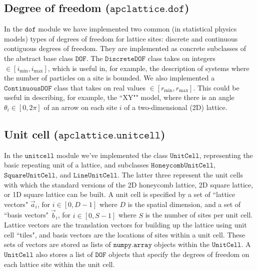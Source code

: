 \documentclass{article}
\begin{document}
\subsection{Degree of freedom ($\texttt{apclattice.dof}$)}
In the $\texttt{dof}$ module we have implemented two common (in statistical physics models) types of degrees of freedom for lattice sites: discrete and continuous contiguous degrees of freedom. They are implemented as concrete subclasses of the abstract base class $\texttt{DOF}$. The $\texttt{DiscreteDOF}$ class takes on integers $\in [i_\mathrm{min}, i_\mathrm{max}]$, which is useful in, for example, the description of systems where the number of particles on a site is bounded. We also implemented a $\texttt{ContinuousDOF}$ class that takes on real values $\in [r_\mathrm{min}, r_\mathrm{max}]$. This could be useful in describing, for example, the ``XY"" model, where there is an angle $\theta_i \in [0, 2 \pi]$ of an arrow on each site $i$ of a two-dimensional (2D) lattice.

\subsection{Unit cell ($\texttt{apclattice.unitcell}$)}
In the $\texttt{unitcell}$ module we've implemented the class $\texttt{UnitCell}$, representing the basic repeating unit of a lattice, and subclasses $\texttt{HoneycombUnitCell}$, $\texttt{SquareUnitCell}$, and $\texttt{LineUnitCell}$. The latter three represent the unit cells with which the standard versions of the 2D honeycomb lattice, 2D square lattice, or 1D square lattice can be built. A unit cell is specified by a set of ``lattice vectors" $\vec{a}_i$, for $i\in [0, D-1]$ where $D$ is the spatial dimension, and a set of ``basis vectors" $\vec{b}_i$, for $i \in [0, S-1]$ where $S$ is the number of sites per unit cell. Lattice vectors are the translation vectors for building up the lattice using unit cell ``tiles", and basis vectors are the locations of sites within a unit cell. These sets of vectors are stored as lists of $\texttt{numpy.array}$ objects within the $\texttt{UnitCell}$. A $\texttt{UnitCell}$ also stores a list of $\texttt{DOF}$ objects that specify the degrees of freedom on each lattice site within the unit cell.
\end{document}
